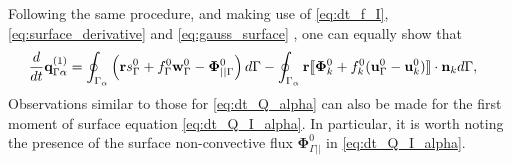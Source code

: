 Following the same procedure, and making use of \ref{eq:dt_f_I}, \ref{eq:surface_derivative} and \ref{eq:gauss_surface} , one can equally show that 
\begin{align}
    \ddt {\textbf{q}^{(1)}_{\Gamma\alpha}}
    &= \intS{ \left(
        \textbf{r}s_\Gamma^0
        + f_\Gamma^0 \textbf{w}_\Gamma^0
        - \mathbf{\Phi}_{||\Gamma}^0
    \right) }
    - \intS{\textbf{r} 
    \Jump{\mathbf{\Phi}_k^0
        + f_k^0 (\textbf{u}_\Gamma^0 - \textbf{u}_k^0)
    }
    },
    \label{eq:dt_Q_I_alpha}
\end{align}
Observations similar to those for \ref{eq:dt_Q_alpha} can also be made for the first moment of surface equation \ref{eq:dt_Q_I_alpha}.
In particular, it is worth noting the presence of the surface non-convective flux $\mathbf{\Phi}_{\Gamma||}^0$ in \ref{eq:dt_Q_I_alpha}.

